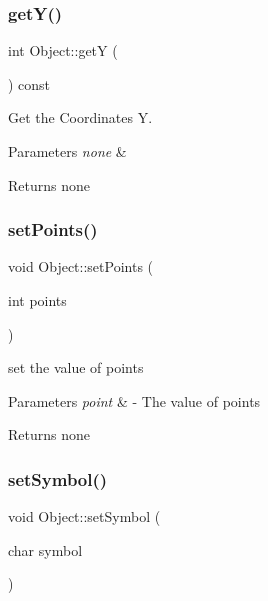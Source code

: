 \subsubsection{\texorpdfstring{get\+Y()}{getY()}}
{\footnotesize\ttfamily int Object\+::getY (\begin{DoxyParamCaption}{ }\end{DoxyParamCaption}) const}



Get the Coordinates Y. 


\begin{DoxyParams}{Parameters}
{\em none} & \\
\hline
\end{DoxyParams}
\begin{DoxyReturn}{Returns}
none 
\end{DoxyReturn}
\mbox{\label{class_object_a6ad44e8d6238a0246882864be6c83e8e}} 
\subsubsection{\texorpdfstring{set\+Points()}{setPoints()}}
{\footnotesize\ttfamily void Object\+::set\+Points (\begin{DoxyParamCaption}\item[{int}]{points }\end{DoxyParamCaption})}



set the value of points 


\begin{DoxyParams}{Parameters}
{\em point} & -\/ The value of points \\
\hline
\end{DoxyParams}
\begin{DoxyReturn}{Returns}
none 
\end{DoxyReturn}
\mbox{\label{class_object_a7f524c95bbc774e71d692125d085be7e}} 
\subsubsection{\texorpdfstring{set\+Symbol()}{setSymbol()}}
{\footnotesize\ttfamily void Object\+::set\+Symbol (\begin{DoxyParamCaption}\item[{char}]{symbol }\end{DoxyParamCaption})\hspace{0.3cm}{\ttfamily [protected]}}



